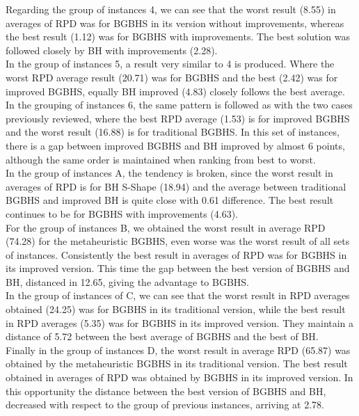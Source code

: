 Regarding the group of instances 4, we can see that the worst result (8.55) in averages of RPD was for BGBHS in its version without improvements, whereas the best result (1.12) was for BGBHS with improvements. The best solution was followed closely by BH with improvements (2.28).\\

In the group of instances 5, a result very similar to 4 is produced. Where the worst RPD average result (20.71) was for BGBHS and the best (2.42) was for improved BGBHS, equally BH improved (4.83) closely follows the best average.\\

In the grouping of instances 6, the same pattern is followed as with the two cases previously reviewed, where the best RPD average (1.53) is for improved BGBHS and the worst result (16.88) is for traditional BGBHS. In this set of instances, there is a gap between improved BGBHS and BH improved by almost 6 points, although the same order is maintained when ranking from best to worst.\\

In the group of instances A, the tendency is broken, since the worst result in averages of RPD is for BH S-Shape (18.94) and the average between traditional BGBHS and improved BH is quite close with 0.61 difference. The best result continues to be for BGBHS with improvements (4.63).\\

For the group of instances B, we obtained the worst result in average RPD (74.28) for the metaheuristic BGBHS, even worse was the worst result of all sets of instances. Consistently the best result in averages of RPD was for BGBHS in its improved version. This time the gap between the best version of BGBHS and BH, distanced in 12.65, giving the advantage to BGBHS.\\

In the group of instances of C, we can see that the worst result in RPD averages obtained (24.25) was for BGBHS in its traditional version, while the best result in RPD averages (5.35) was for BGBHS in its improved version. They maintain a distance of 5.72 between the best average of BGBHS and the best of BH.\\

Finally in the group of instances D, the worst result in average RPD (65.87) was obtained by the metaheuristic BGBHS in its traditional version. The best result obtained in averages of RPD was obtained by BGBHS in its improved version. In this opportunity the distance between the best version of BGBHS and BH, decreased with respect to the group of previous instances, arriving at 2.78.\\

